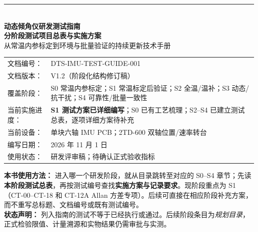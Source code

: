 \begin{titlepage}
\vspace*{3.5cm}
{\color{teal}\rule{3cm}{2pt}}\\[1.15cm]
{\Huge\bfseries\color{navy} 动态倾角仪研发测试指南}\\[0.35cm]
{\Large\bfseries 分阶段测试项目总表与实施方案}\\[1.5cm]
{\large 从常温内参标定到环境与批量验证的持续更新技术手册}\\[1.6cm]
\begin{tabular}{@{}lp{9.3cm}@{}}
文档编号： & DTS-IMU-TEST-GUIDE-001\\[0.32cm]
文档版本： & V1.2（阶段化结构修订稿）\\[0.32cm]
覆盖阶段： & S0 常温内参标定；S1 常温标定后验证；S2 全温/温补；S3 动态/抗干扰；S4 可靠性/批量一致性\\[0.32cm]
当前实施进度： & \textbf{S1 测试方案已详细编写}；S0 已有工艺梳理；S2--S4 已建立测试总表，逐项详细方案待补充\\[0.32cm]
当前设备： & 单块六轴 IMU PCB；2TD-600 双轴位置/速率转台\\[0.32cm]
编写日期： & 2026 年 11 月 1 日\\[0.32cm]
使用状态： & 研发评审稿；待确认正式验收指标\\
\end{tabular}
\vfill
\begin{keynote}
\textbf{本书使用方法：} 进入哪一个研发阶段，就从目录跳转至对应的 S0--S4 章节；先读\textbf{本阶段测试总表}，再按测试编号查找\textbf{实施方案与记录要求}。现阶段重点为 S1（CT-00--CT-18 和 CT-12A Allan 方差专项）。后续可直接在相应阶段补充方案，而不重写总标题、文档编号或既有测试编号。\\
\textbf{状态声明：} 列入指南的测试不等于已经执行或通过。后续阶段条目为\emph{规划目录}，正式检验限值、计量溯源和实物结果仍需审批与实测。
\end{keynote}
\end{titlepage}

